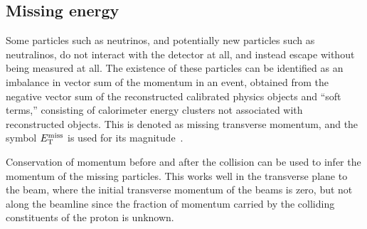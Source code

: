 \FloatBarrier
\subsection{Missing energy} 
\label{sec:met}

Some particles such as neutrinos, and potentially new particles such as
neutralinos, do not interact with the detector at all, and instead escape
without being measured at all.
The existence of these particles can be identified as an imbalance in vector
sum of the momentum in an event, obtained from the negative vector sum of the
reconstructed calibrated physics objects and ``soft terms,'' consisting of
calorimeter energy clusters not associated with reconstructed objects.
This is denoted as missing transverse momentum, and the symbol
$E_{\mathrm{T}}^{\mathrm{miss}}$ is used for its magnitude~\cite{ATLAS-CONF-2013-082}.

Conservation of momentum before and after the collision can be used to infer
the momentum of the missing particles.
This works well in the transverse plane to the beam, where the initial
transverse momentum of the beams is zero, but not along the beamline since the
fraction of momentum carried by the colliding constituents of the proton is
unknown.
